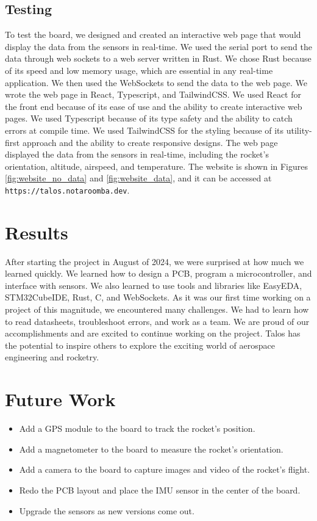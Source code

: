 \documentclass{article}
\begin{document}
\subsection{Testing}
\qquad To test the board, we designed and created an interactive web page that would display the data from the sensors in real-time. We used the serial port to send the data through web sockets to a web server written in Rust. We chose Rust because of its speed and low memory usage, which are essential in any real-time application. We then used the WebSockets to send the data to the web page. We wrote the web page in React, Typescript, and TailwindCSS. We used React for the front end because of its ease of use and the ability to create interactive web pages. We used Typescript because of its type safety and the ability to catch errors at compile time. We used TailwindCSS for the styling because of its utility-first approach and the ability to create responsive designs. The web page displayed the data from the sensors in real-time, including the rocket's orientation, altitude, airspeed, and temperature. The website is shown in Figures \ref{fig:website_no_data} and \ref{fig:website_data}, and it can be accessed at \texttt{https://talos.notaroomba.dev}.

\section{Results}
\qquad After starting the project in August of 2024, we were surprised at how much we learned quickly. We learned how to design a PCB, program a microcontroller, and interface with sensors. We also learned to use tools and libraries like EasyEDA, STM32CubeIDE, Rust, C, and WebSockets. As it was our first time working on a project of this magnitude, we encountered many challenges. We had to learn how to read datasheets, troubleshoot errors, and work as a team. We are proud of our accomplishments and are excited to continue working on the project. Talos has the potential to inspire others to explore the exciting world of aerospace engineering and rocketry.

\section{Future Work}
\begin{itemize}
      \item Add a GPS module to the board to track the rocket's position.
      \item Add a magnetometer to the board to measure the rocket's orientation.
      \item Add a camera to the board to capture images and video of the rocket's flight.
      \item Redo the PCB layout and place the IMU sensor in the center of the board.
      \item Upgrade the sensors as new versions come out.
\end{itemize}
\printbibliography
\end{document}
